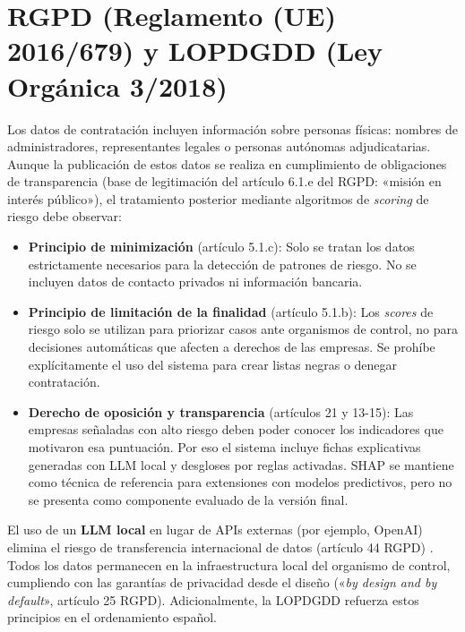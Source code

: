 \documentclass[11pt,a4paper,spanish]{book}
\numberwithin{equation}{chapter}
\numberwithin{figure}{chapter}
\begin{document}
\section{RGPD (Reglamento (UE) 2016/679) y LOPDGDD (Ley Orgánica 3/2018)}

Los datos de contratación incluyen información sobre personas físicas: nombres de administradores, representantes legales o personas autónomas adjudicatarias. Aunque la publicación de estos datos se realiza en cumplimiento de obligaciones de transparencia (base de legitimación del artículo 6.1.e del RGPD: «misión en interés público»), el tratamiento posterior mediante algoritmos de \textit{scoring} de riesgo debe observar:

\begin{itemize}
\item \textbf{Principio de minimización} (artículo 5.1.c): Solo se tratan los datos estrictamente necesarios para la detección de patrones de riesgo. No se incluyen datos de contacto privados ni información bancaria.

\item \textbf{Principio de limitación de la finalidad} (artículo 5.1.b): Los \textit{scores} de riesgo solo se utilizan para priorizar casos ante organismos de control, no para decisiones automáticas que afecten a derechos de las empresas. Se prohíbe explícitamente el uso del sistema para crear listas negras o denegar contratación.

\item \textbf{Derecho de oposición y transparencia} (artículos 21 y 13-15): Las empresas señaladas con alto riesgo deben poder conocer los indicadores que motivaron esa puntuación. Por eso el sistema incluye fichas explicativas generadas con LLM local y desgloses por reglas activadas. SHAP se mantiene como técnica de referencia para extensiones con modelos predictivos, pero no se presenta como componente evaluado de la versi{\'o}n final.
\end{itemize}

El uso de un \textbf{LLM local} en lugar de APIs externas (por ejemplo, OpenAI) elimina el riesgo de transferencia internacional de datos (artículo 44 RGPD) \cite{RGPD2016}. Todos los datos permanecen en la infraestructura local del organismo de control, cumpliendo con las garantías de privacidad desde el diseño («\textit{by design and by default}», artículo 25 RGPD). Adicionalmente, la LOPDGDD \cite{LOPDGDD2018} refuerza estos principios en el ordenamiento español.
\end{document}
